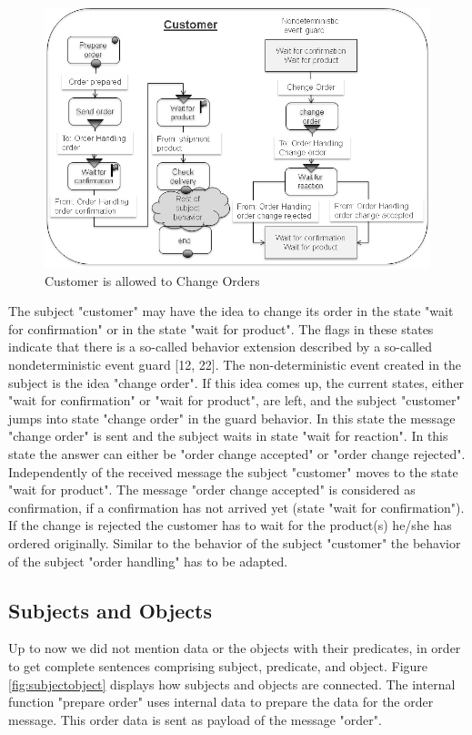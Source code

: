 \strictpagecheck
\begin{figure}[ph]
	\centering
	\includegraphics[width=0.7\linewidth]{20181026-Ontologie-Bilder/Grafiken-Ontologie/SUbjectExecution/OrderCustomerChange}
	\caption[Customer is allowed to Change Orders]{Customer is allowed to Change Orders}
	\label{fig:ordercustomerchange}
\end{figure}


The subject "customer" may have the idea to change its order in the state "wait for confirmation" or in the state "wait for product". The flags in these states indicate that there is a so-called behavior extension described by a so-called nondeterministic event guard [12, 22]. The non-deterministic event created in the subject is the idea "change order". If this idea comes up, the current states, either "wait for confirmation" or "wait for product", are left, and the subject "customer" jumps into state "change order" in the guard behavior. In this state the message "change order" is sent and the subject waits in state "wait for reaction". In this state the answer can either be "order change accepted" or "order change rejected". Independently of the received message the subject "customer" moves to the state "wait for product". The message "order change accepted" is considered as confirmation, if a confirmation has not arrived yet (state "wait for confirmation"). If the change is rejected the customer has to wait for the product(s) he/she has ordered originally.
Similar to the behavior of the subject "customer" the behavior of the subject "order handling" has to be adapted.


\subsection{Subjects and Objects}
\label{SUbjects-Objects}

Up to now we did not mention data or the objects with their predicates, in order to get complete sentences comprising subject, predicate, and object. Figure \ref{fig:subjectobject} displays how subjects and objects are connected. The internal function "prepare order" uses internal data to prepare the data for the order message. This order data is sent as payload of the message "order".

